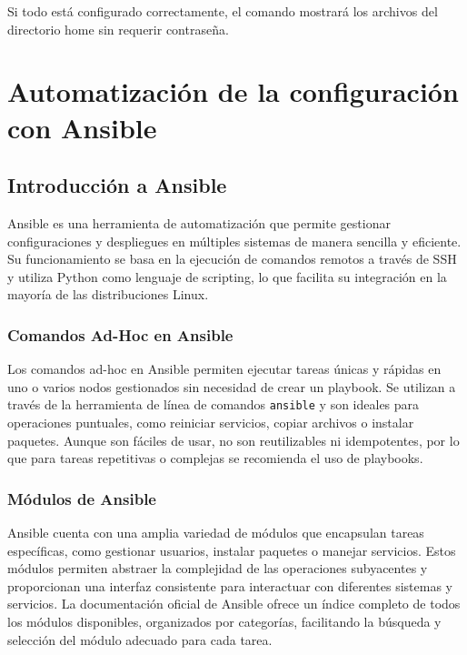 Si todo está configurado correctamente, el comando mostrará los archivos del directorio home sin requerir contraseña.

\newpage
\section{Automatización de la configuración con Ansible}

\subsection{Introducción a Ansible}

Ansible es una herramienta de automatización que permite gestionar configuraciones y despliegues en múltiples sistemas de manera sencilla y eficiente. Su funcionamiento se basa en la ejecución de comandos remotos a través de SSH y utiliza Python como lenguaje de scripting, lo que facilita su integración en la mayoría de las distribuciones Linux.

\subsubsection{Comandos Ad-Hoc en Ansible}

Los comandos ad-hoc en Ansible permiten ejecutar tareas únicas y rápidas en uno o varios nodos gestionados sin necesidad de crear un playbook. Se utilizan a través de la herramienta de línea de comandos \texttt{ansible} y son ideales para operaciones puntuales, como reiniciar servicios, copiar archivos o instalar paquetes. Aunque son fáciles de usar, no son reutilizables ni idempotentes, por lo que para tareas repetitivas o complejas se recomienda el uso de playbooks. \cite{turn0search0}

\subsubsection{Módulos de Ansible}

Ansible cuenta con una amplia variedad de módulos que encapsulan tareas específicas, como gestionar usuarios, instalar paquetes o manejar servicios. Estos módulos permiten abstraer la complejidad de las operaciones subyacentes y proporcionan una interfaz consistente para interactuar con diferentes sistemas y servicios. La documentación oficial de Ansible ofrece un índice completo de todos los módulos disponibles, organizados por categorías, facilitando la búsqueda y selección del módulo adecuado para cada tarea. \cite{turn0search4}

